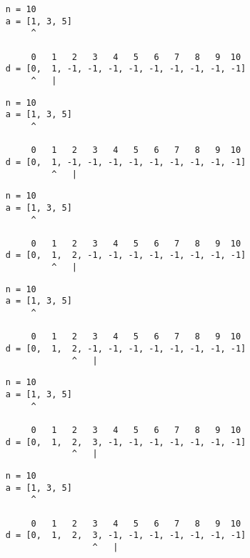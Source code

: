 \begin{frame}[fragile]
\begin{verbatim}
     n = 10
     a = [1, 3, 5]
          ^

          0   1   2   3   4   5   6   7   8   9  10
     d = [0,  1, -1, -1, -1, -1, -1, -1, -1, -1, -1]
          ^   |
\end{verbatim}
\end{frame}
\addtocounter{framenumber}{-1}

\begin{frame}[fragile]
\begin{verbatim}
     n = 10
     a = [1, 3, 5]
          ^

          0   1   2   3   4   5   6   7   8   9  10
     d = [0,  1, -1, -1, -1, -1, -1, -1, -1, -1, -1]
              ^   |
\end{verbatim}
\end{frame}
\addtocounter{framenumber}{-1}

\begin{frame}[fragile]
\begin{verbatim}
     n = 10
     a = [1, 3, 5]
          ^

          0   1   2   3   4   5   6   7   8   9  10
     d = [0,  1,  2, -1, -1, -1, -1, -1, -1, -1, -1]
              ^   |
\end{verbatim}
\end{frame}
\addtocounter{framenumber}{-1}

\begin{frame}[fragile]
\begin{verbatim}
     n = 10
     a = [1, 3, 5]
          ^

          0   1   2   3   4   5   6   7   8   9  10
     d = [0,  1,  2, -1, -1, -1, -1, -1, -1, -1, -1]
                  ^   |
\end{verbatim}
\end{frame}
\addtocounter{framenumber}{-1}

\begin{frame}[fragile]
\begin{verbatim}
     n = 10
     a = [1, 3, 5]
          ^

          0   1   2   3   4   5   6   7   8   9  10
     d = [0,  1,  2,  3, -1, -1, -1, -1, -1, -1, -1]
                  ^   |
\end{verbatim}
\end{frame}
\addtocounter{framenumber}{-1}

\begin{frame}[fragile]
\begin{verbatim}
     n = 10
     a = [1, 3, 5]
          ^

          0   1   2   3   4   5   6   7   8   9  10
     d = [0,  1,  2,  3, -1, -1, -1, -1, -1, -1, -1]
                      ^   |
\end{verbatim}
\end{frame}
\addtocounter{framenumber}{-1}

